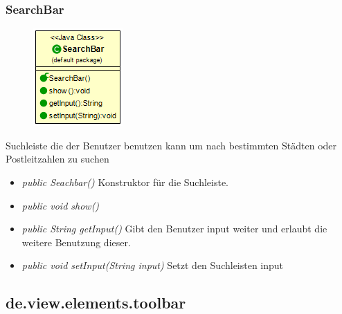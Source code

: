 \subsubsection{SearchBar}
\begin{minipage}{0.3\textwidth}
    \begin{figure}[H]
        \includegraphics[scale = 0.5
        ]{media/view/navbar/Searchbar_Class.png}
    \end{figure}
    \end{minipage} \hfill
    \begin{minipage}{0.6\textwidth}
Suchleiste die der Benutzer benutzen kann um nach bestimmten Städten oder Postleitzahlen zu suchen
\end{minipage}
\begin{itemize} [noitemsep]
    \item \emph{public Seachbar()} Konstruktor für die Suchleiste.
    \item \emph{public void show()} 
    \item \emph{public String getInput()} Gibt den Benutzer input weiter und erlaubt die weitere Benutzung dieser.
    \item \emph{public void setInput(String input)} Setzt den Suchleisten input
\end{itemize}

\subsection{de.view.elements.toolbar}

